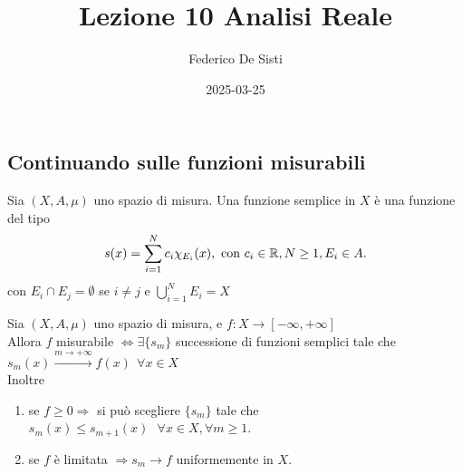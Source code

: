 \documentclass[12px]{article}
\title{Lezione 10 Analisi Reale}
\date{2025-03-25}
\author{Federico De Sisti}
\begin{document}
	\maketitle
	\newpage
	\subsection{Continuando sulle funzioni misurabili}
	\begin{defi}
	Sia $(X,A,\mu)$ uno spazio di misura. Una funzione semplice in  $X$ è una funzione del tipo
	\[
		s(x) = \sum_{i =1 }^{N}c_i\chi_{E_i}(x), \text { con }c_i\in \mathbb{R}, N\geq 1, E_i\in A
	.\] 
	con $E_i\cap E_j= \emptyset$ se  $i\neq j$ e  $ \bigcup^{N}_{i=1}E_i = X$
\end{defi}
\begin{teo}
	Sia $(X,A,\mu)$ uno spazio di misura, e $f: X \rightarrow [-\infty,+\infty]$\\
	Allora $f $ misurabile $ \Leftrightarrow \exists\{s_m\}$  successione di funzioni semplici tale che $ s_m(x) \xrightarrow{ m \rightarrow +\infty}f(x)\ \ \forall x\in X$\\
	Inoltre
	\begin{enumerate}
		\item se  $f\geq 0 \Rightarrow $ si può scegliere $\{s_m\}$ tale che $s_m(x)\leq s_{m+1}(x) \ \ \ \forall x\in X, \forall m\geq 1$.
		\item se  $f$ è limitata $ \Rightarrow s_m \rightarrow f$ uniformemente in $X$.
	\end{enumerate}
\end{teo}
\end{document}
